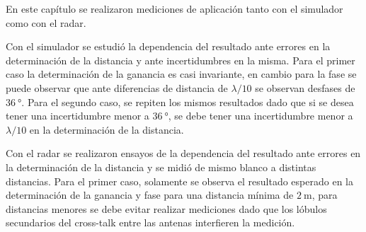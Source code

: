 En este capítulo se realizaron mediciones de aplicación tanto con el simulador como con el radar.

Con el simulador se estudió la dependencia del resultado ante errores en la determinación de la distancia y ante incertidumbres en la misma. Para el primer caso la determinación de la ganancia es casi invariante, en cambio para la fase se puede observar que ante diferencias de distancia de $\lambda / 10$ se observan desfases de $\SI{36}{\degree}$. Para el segundo caso, se repiten los mismos resultados dado que si se desea tener una incertidumbre menor a $\SI{36}{\degree}$, se debe tener una incertidumbre menor a $\lambda / 10$ en la determinación de la distancia.

Con el radar se realizaron ensayos de la dependencia del resultado ante errores en la determinación de la distancia y se midió de mismo blanco a distintas distancias. Para el primer caso, solamente se observa el resultado esperado en la determinación de la ganancia y fase para una distancia mínima de $\SI{2}{\meter}$, para distancias menores se debe evitar realizar mediciones dado que los lóbulos secundarios del cross-talk entre las antenas interfieren la medición.